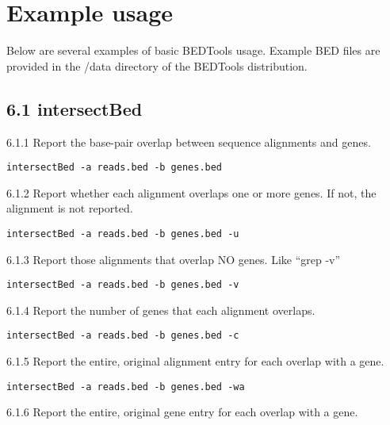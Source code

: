 \documentclass[letterpaper,10pt,english]{sphinxmanual}
\begin{document}
\section{Example usage}
\label{content/example-usage:example-usage}\label{content/example-usage::doc}
Below are several examples of basic BEDTools usage. Example BED files are provided in the
/data directory of the BEDTools distribution.


\subsection{6.1 intersectBed}
\label{content/example-usage:intersectbed}
6.1.1 Report the base-pair overlap between sequence alignments and genes.

\begin{Verbatim}[commandchars=\\\{\}]
intersectBed -a reads.bed -b genes.bed
\end{Verbatim}

6.1.2 Report whether each alignment overlaps one or more genes. If not, the alignment is not reported.

\begin{Verbatim}[commandchars=\\\{\}]
intersectBed -a reads.bed -b genes.bed -u
\end{Verbatim}

6.1.3 Report those alignments that overlap NO genes. Like ``grep -v''

\begin{Verbatim}[commandchars=\\\{\}]
intersectBed -a reads.bed -b genes.bed -v
\end{Verbatim}

6.1.4 Report the number of genes that each alignment overlaps.

\begin{Verbatim}[commandchars=\\\{\}]
intersectBed -a reads.bed -b genes.bed -c
\end{Verbatim}

6.1.5 Report the entire, original alignment entry for each overlap with a gene.

\begin{Verbatim}[commandchars=\\\{\}]
intersectBed -a reads.bed -b genes.bed -wa
\end{Verbatim}

6.1.6 Report the entire, original gene entry for each overlap with a gene.
\end{document}
